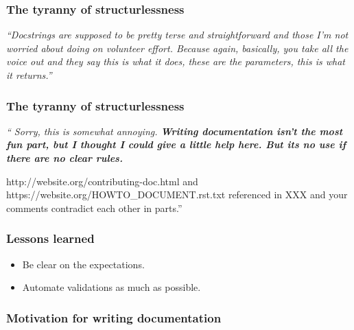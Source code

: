 \documentclass[xcolor=dvipsnames]{beamer}
\begin{document}
\begin{frame}
\frametitle{The tyranny of structurlessness}

{\Large \em ``Docstrings are supposed to be pretty terse and straightforward
and those I'm not worried about doing on volunteer effort. Because again,
basically, you take all the voice out and they say this is what it does, these
are the parameters, this is what it returns.''}
\end{frame}

\begin{frame}
\frametitle{The tyranny of structurlessness}
{\em``
Sorry, this is somewhat annoying. {\bf Writing documentation isn't the most fun
part, but I thought I could give a little help here. But its no use if there
are no clear rules.}

http://website.org/contributing-doc.html and https://website.org/HOWTO\_DOCUMENT.rst.txt
referenced in XXX
and your comments contradict each other in parts.''}
\end{frame}

\begin{frame}
\frametitle{Lessons learned}

\begin{itemize}[label={$\bullet$}]
\item Be clear on the expectations.
\item Automate validations as much as possible.
\end{itemize}

\end{frame}

\begin{frame}
\frametitle{Motivation for writing documentation}
\end{frame}
\end{document}
